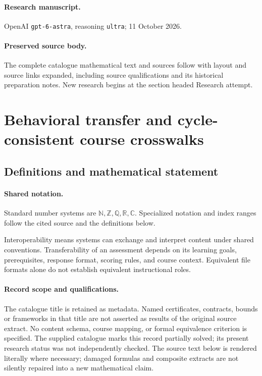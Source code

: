 \documentclass[11pt]{article}
\begin{document}
\paragraph{Research manuscript.} OpenAI \texttt{gpt-6-astra}, reasoning \texttt{ultra}; 11 October 2026.
\paragraph{Preserved source body.} The complete catalogue mathematical text and sources follow with layout and source links expanded, including source qualifications and its historical preparation notes. New research begins at the section headed Research attempt.

\section{Behavioral transfer and cycle-consistent course crosswalks}\label{statement}

\subsection{Definitions and mathematical statement}

\paragraph{Shared notation.}Standard number systems are $\mathbb N,\mathbb Z,\mathbb Q,\mathbb R,\mathbb C$. Specialized notation and index ranges follow the cited source and the definitions below.


Interoperability means systems can exchange and interpret content under shared conventions. Transferability of an assessment depends on its learning goals, prerequisites, response format, scoring rules, and course context. Equivalent file formats alone do not establish equivalent instructional roles.
\paragraph{Record scope and qualifications.}
The catalogue title is retained as metadata. Named certificates, contracts, bounds or frameworks in that title are not asserted as results of the original source extract.
No content schema, course mapping, or formal equivalence criterion is specified. The supplied catalogue marks this record partially solved; its present research status was not independently checked.
The source text below is rendered literally where necessary; damaged formulas and composite extracts are not silently repaired into a new mathematical claim.
\end{document}
